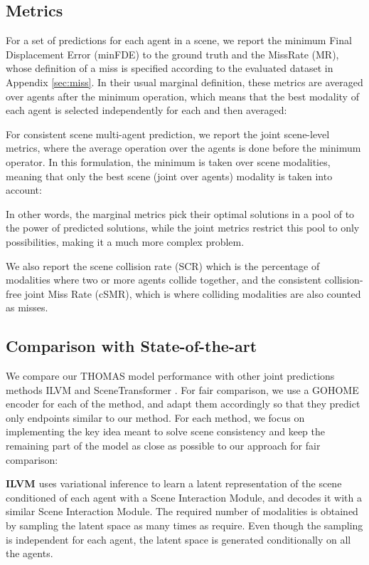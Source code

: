 \documentclass{article} \usepackage{iclr2022_conference,times}
\begin{document}
\subsection{Metrics}
\label{sec:metrics}

For a set of  predictions  for each agent  in a scene, we report the  minimum Final Displacement Error (minFDE) to the ground truth  and the MissRate (MR), whose definition of a miss is specified according to the evaluated dataset in Appendix \ref{sec:miss}. In their usual marginal definition, these metrics are averaged over agents after the minimum operation, which means that the best modality of each agent is selected independently for each and then averaged:

For consistent scene multi-agent prediction, we report the joint scene-level metrics, where the average operation over the agents is done before the minimum operator. In this formulation, the minimum is taken over scene modalities, meaning that only the  best scene (joint over agents) modality is taken into account:

In other words, the marginal metrics pick their optimal solutions in a pool of  to the power of  predicted solutions, while the joint metrics restrict this pool to only  possibilities, making it a much more complex problem. 

We also report the scene collision rate (SCR) which is the percentage of modalities where two or more agents collide together, and the consistent collision-free joint Miss Rate (cSMR), which is  where colliding modalities are also counted as misses.








\subsection{Comparison with State-of-the-art}

We compare our THOMAS model performance with other joint predictions methods ILVM \citep{casas2020implicit} and SceneTransformer \citep{ngiam2021scene}. For fair comparison, we use a GOHOME encoder for each of the method, and adapt them accordingly so that they predict only endpoints similar to our method. For each method, we focus on implementing the key idea meant to solve scene consistency and keep the remaining part of the model as close as possible to our approach for fair comparison:


\textbf{ILVM \citep{casas2020implicit}} uses variational inference to learn a latent representation of the scene conditioned of each agent with a Scene Interaction Module, and decodes it with a similar Scene Interaction Module. The required number of modalities is obtained by sampling the latent space as many times as require. Even though the sampling is independent for each agent, the latent space is generated conditionally on all the agents. 
\end{document}
